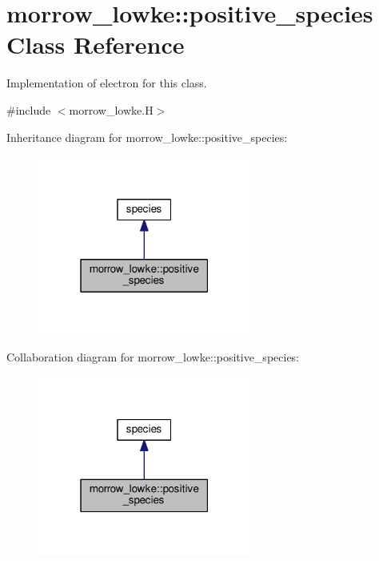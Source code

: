 \hypertarget{classmorrow__lowke_1_1positive__species}{}\section{morrow\+\_\+lowke\+:\+:positive\+\_\+species Class Reference}
\label{classmorrow__lowke_1_1positive__species}


Implementation of electron for this class.  




{\ttfamily \#include $<$morrow\+\_\+lowke.\+H$>$}



Inheritance diagram for morrow\+\_\+lowke\+:\+:positive\+\_\+species\+:\nopagebreak
\begin{figure}[H]
\begin{center}
\leavevmode
\includegraphics[width=199pt]{classmorrow__lowke_1_1positive__species__inherit__graph}
\end{center}
\end{figure}


Collaboration diagram for morrow\+\_\+lowke\+:\+:positive\+\_\+species\+:\nopagebreak
\begin{figure}[H]
\begin{center}
\leavevmode
\includegraphics[width=199pt]{classmorrow__lowke_1_1positive__species__coll__graph}
\end{center}
\end{figure}
